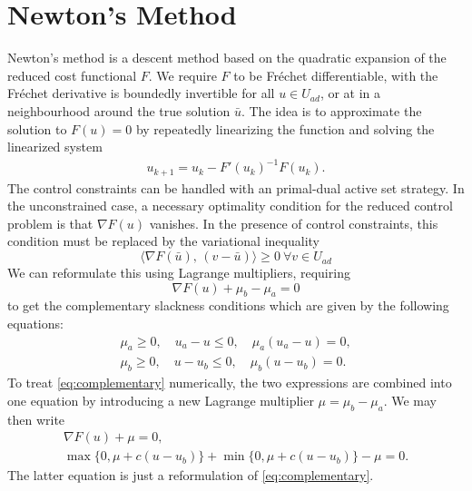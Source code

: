 \clearpage

\section{Newton's Method}\label{Appendix}
Newton's method is a descent method based on the quadratic expansion of the reduced cost functional $F$. We require $F$ to be Fréchet differentiable, with the Fréchet derivative is boundedly invertible for all $u \in U_{ad}$, or at in a neighbourhood around the true solution $\bar{u}$. The idea is to approximate the solution to $F(u) = 0$ by repeatedly linearizing the function and solving the linearized system
\begin{align}
    \label{eq:Newton}
    u_{k+1} = u_k - F'(u_k)^{-1}F(u_k).
\end{align}
The control constraints can be handled with an primal-dual active set strategy. In the unconstrained case, a necessary optimality condition for the reduced control problem is that $\nabla F(u)$ vanishes. In the presence of control constraints, this condition must be replaced by the variational inequality
\begin{equation}
    \langle \nabla F(\bar{u}),\, (v-\bar{u}) \rangle \geq 0 \ \forall v \in U_{ad}
\end{equation}
We can reformulate this using Lagrange multipliers, requiring 
\begin{equation*}
    \nabla F(u) + \mu_b - \mu_a =0 
\end{equation*}
to get the complementary slackness conditions which are given by the following equations:
\begin{subequations}
    \label{eq:complementary}
\begin{align}
    \mu_a \geq 0, \quad u_a - u \leq 0, \quad \mu_a(u_a - u) = 0, \\
    \mu_b \geq 0, \quad u - u_b \leq 0, \quad \mu_b(u-u_b) =0.
\end{align}
\end{subequations}
To treat \eqref{eq:complementary} numerically, the two expressions are combined into one equation by introducing a new Lagrange multiplier $\mu = \mu_b - \mu_a$. We may then write
\begin{align}
    \label{eq:finalComp}
    \nabla F(u) + \mu = 0, \\
    \max \{0, \mu + c(u-u_b) \} + \min \{0, \mu + c(u-u_b) \} - \mu = 0.
\end{align}
%
The latter equation is just a reformulation of \eqref{eq:complementary}.

